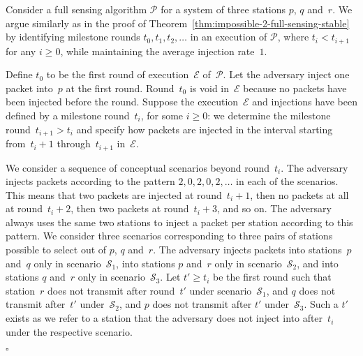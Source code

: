 \documentclass[11pt]{article}
\newcommand{\cE}{\mathcal{E}}
\newcommand{\cP}{\mathcal{P}}
\newcommand{\cS}{\mathcal{S}}
\newcommand{\qed}{\hfill $\square$ \smallbreak}
\newenvironment{proof}{\noindent{\bf Proof:}}{\qed}
\begin{document}
\begin{proof}
Consider a full sensing algorithm $\cP$ for a system of three stations $p$, $q$ and~$r$.
We argue similarly as in the proof of Theorem~\ref{thm:impossible-2-full-sensing-stable} by  identifying milestone rounds $t_{0}, t_{1},t_{2},\ldots$ in an execution of $\cP$, where $t_{i}<t_{i+1}$ for any $i\ge 0$, while maintaining the average injection rate~$1$.

Define $t_{0}$ to be the first round of execution~$\cE$ of~$\cP$.
Let the adversary inject one packet into~$p$ at the first round. 
Round~$t_0$ is void in~$\cE$ because no packets have been injected before the round.
Suppose the execution~$\cE$ and injections have been defined by a milestone round~$t_{i}$, for some $i\ge 0$: we determine the milestone round~$t_{i+1}>t_{i}$ and specify how packets are injected in the interval starting from~$t_{i}+1$ through~$t_{i+1}$ in~$\cE$.

We consider a sequence of conceptual scenarios beyond round~$t_i$.
The adversary injects packets according to the pattern $2,0,2,0,2,\ldots$ in each of the scenarios.
This means that two packets are injected at round~$t_i+1$, then no packets at all at round~$t_i+2$, then two packets at round~$t_i+3$, and so on.
The adversary always uses the same two stations to inject a packet per station according to this pattern.
We consider three scenarios corresponding to three pairs of stations possible to select out of $p$, $q$ and~$r$.
The adversary injects packets into stations~$p$ and~$q$ only in scenario~$\cS_1$, into stations $p$ and~$r$ only in scenario~$\cS_2$, and into stations $q$ and~$r$ only in scenario~$\cS_3$.
Let $t'\ge t_i$ be the first round such that station~$r$ does not transmit after round~$t'$ under scenario~$\cS_1$, and $q$ does not transmit after~$t'$ under~$\cS_2$, and $p$ does not transmit after $t'$ under~$\cS_3$.
Such a $t'$ exists as we refer to a station that the adversary does not inject into after~$t_i$ under the respective scenario.


\end{proof}
\end{document}
